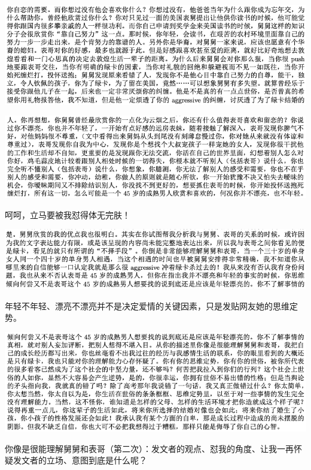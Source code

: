 \documentclass[9pt, b5paper]{article}
\begin{document}
\begin{center}
\includegraphics[width=.9\linewidth]{./pic/p1p109-4.png}
\end{center}

\begin{center}
\includegraphics[width=.9\linewidth]{./pic/p1p109-5.png}
\end{center}

呵呵，立马要被我怼得体无完肤！

\begin{center}
\includegraphics[width=.9\linewidth]{./pic/p1p114-4.png}
\end{center}

年轻不年轻、漂亮不漂亮并不是决定爱情的关键因素，只是发贴网友她的思维定势。

\begin{center}
\includegraphics[width=.9\linewidth]{./pic/p1p114-5.png}
\end{center}

你像是很能理解舅舅和表哥（第二次）：发文者的观点、怼我的角度、让我一再怀疑发文者的立场、意图到底是什么呢？
\end{document}
